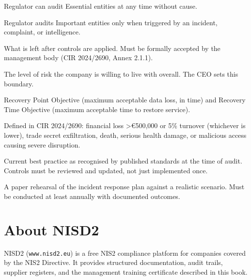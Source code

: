 \documentclass[11pt,a4paper,twoside]{book}
\begin{document}
\begin{description}[style=nextline, leftmargin=0pt, labelindent=0pt, parsep=5pt, itemsep=2pt]
  \item[Proactive supervision] Regulator can audit Essential entities at any time without cause.

  \item[Reactive supervision] Regulator audits Important entities only when triggered by an incident, complaint, or intelligence.

  \item[Residual risk] What is left after controls are applied. Must be formally accepted by the management body (CIR 2024/2690, Annex 2.1.1).

  \item[Risk appetite] The level of risk the company is willing to live with overall. The CEO sets this boundary.

  \item[RPO / RTO] Recovery Point Objective (maximum acceptable data loss, in time) and Recovery Time Objective (maximum acceptable time to restore service).

  \item[Significant incident] Defined in CIR 2024/2690: financial loss \textgreater \euro{}500,000 or 5\% turnover (whichever is lower), trade secret exfiltration, death, serious health damage, or malicious access causing severe disruption.

  \item[State of the art] Current best practice as recognised by published standards at the time of audit. Controls must be reviewed and updated, not just implemented once.

  \item[Tabletop exercise] A paper rehearsal of the incident response plan against a realistic scenario. Must be conducted at least annually with documented outcomes.

\end{description}


\backmatter

\chapter*{About NISD2}

NISD2 (\texttt{www.nisd2.eu}) is a free NIS2 compliance platform for companies covered by the NIS2 Directive. It provides structured documentation, audit trails, supplier registers, and the management training certificate described in this book.
\end{document}

